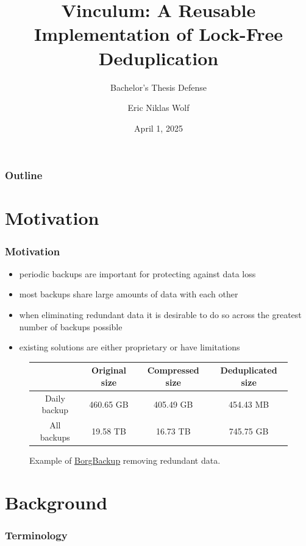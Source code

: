 \documentclass[english,utf8,aspectratio=169]{beamer}
\title{Vinculum: A Reusable Implementation of Lock-Free Deduplication}
\subtitle{Bachelor's Thesis Defense}
\author{Eric Niklas Wolf}
\date{April 1, 2025}
\begin{document}
    \maketitle

    \begin{frame}
        \frametitle{Outline}
        \tableofcontents
    \end{frame}

    \section{Motivation}
    \begin{frame}
        \frametitle{Motivation}
        \begin{itemize}
            \item periodic backups are important for protecting against data loss
            \item most backups share large amounts of data with each other
            \item when eliminating redundant data it is desirable to do so across
                the greatest number of backups possible
            \item existing solutions are either proprietary or have limitations
        \end{itemize}

        \begin{figure}
            \begin{tabular}{ c c c c }
                \toprule
                & Original size & Compressed size & Deduplicated size \\
                \midrule
                Daily backup & 460.65 GB & 405.49 GB & 454.43 MB \\
                \midrule
                All backups & 19.58 TB & 16.73 TB & 745.75 GB \\
                \bottomrule
            \end{tabular}
            \caption{\small{Example of \href{https://www.borgbackup.org}{BorgBackup} removing redundant data.}}
        \end{figure}
    \end{frame}

    \section{Background}
    \begin{frame}
        \frametitle{Terminology}
        \begin{center}
            
        \end{center}
    \end{frame}
    
\end{document}
